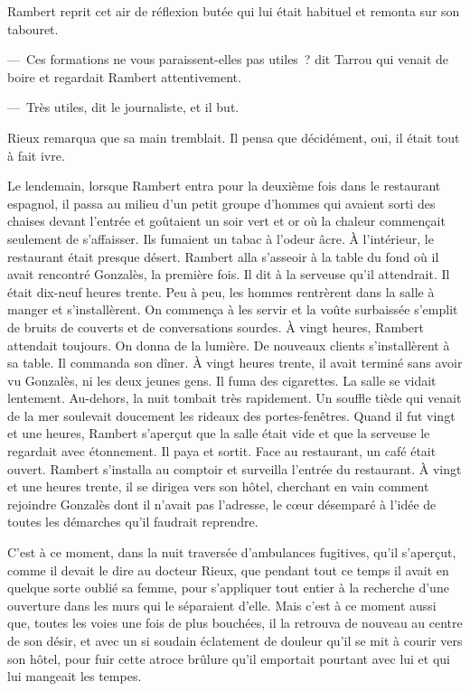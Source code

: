 \documentclass[french,twoside]{book} %
\begin{document}
Rambert reprit cet air de réflexion butée qui lui était habituel et remonta sur son tabouret.\par
— Ces formations ne vous paraissent-elles pas utiles ? dit Tarrou qui venait de boire et regardait Rambert attentivement.\par
— Très utiles, dit le journaliste, et il but.\par
Rieux remarqua que sa main tremblait. Il pensa que décidément, oui, il était tout à fait ivre.\par
Le lendemain, lorsque Rambert entra pour la deuxième fois dans le restaurant espagnol, il passa au milieu d’un petit groupe d’hommes qui avaient sorti des chaises devant l’entrée et goûtaient un soir vert et or où la chaleur commençait seulement de s’affaisser. Ils fumaient un tabac à l’odeur âcre. À l’intérieur, le restaurant était presque désert. Rambert alla s’asseoir à la table du fond où il avait rencontré Gonzalès, la première fois. Il dit à la serveuse qu’il attendrait. Il était dix-neuf heures trente. Peu à peu, les hommes rentrèrent dans la salle à manger et s’installèrent. On commença à les servir et la voûte surbaissée s’emplit de bruits de couverts et de conversations sourdes. À vingt heures, Rambert attendait toujours. On donna de la lumière. De nouveaux clients s’installèrent à sa table. Il commanda son dîner. À vingt heures trente, il avait terminé sans avoir vu Gonzalès, ni les deux jeunes gens. Il fuma des cigarettes. La salle se vidait lentement. Au-dehors, la nuit tombait très rapidement. Un souffle tiède qui venait de la mer soulevait doucement les rideaux des portes-fenêtres. Quand il fut vingt et une heures, Rambert s’aperçut que la salle était vide et que la serveuse le regardait avec étonnement. Il paya et sortit. Face au restaurant, un café était ouvert. Rambert s’installa au comptoir et surveilla l’entrée du restaurant. À vingt et une heures trente, il se dirigea vers son hôtel, cherchant en vain comment rejoindre Gonzalès dont il n’avait pas l’adresse, le cœur désemparé à l’idée de toutes les démarches qu’il faudrait reprendre.\par
C’est à ce moment, dans la nuit traversée d’ambulances fugitives, qu’il s’aperçut, comme il devait le dire au docteur Rieux, que pendant tout ce temps il avait en quelque sorte oublié sa femme, pour s’appliquer tout entier à la recherche d’une ouverture dans les murs qui le séparaient d’elle. Mais c’est à ce moment aussi que, toutes les voies une fois de plus bouchées, il la retrouva de nouveau au centre de son désir, et avec un si soudain éclatement de douleur qu’il se mit à courir vers son hôtel, pour fuir cette atroce brûlure qu’il emportait pourtant avec lui et qui lui mangeait les tempes.\par
\end{document}
